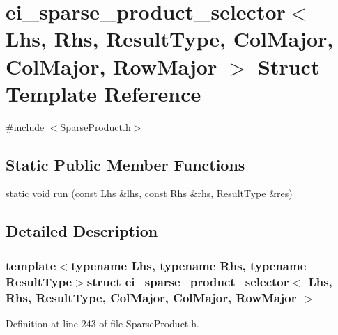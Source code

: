 \hypertarget{structei__sparse__product__selector_3_01_lhs_00_01_rhs_00_01_result_type_00_01_col_major_00_01_col_major_00_01_row_major_01_4}{\section{ei\-\_\-sparse\-\_\-product\-\_\-selector$<$ Lhs, Rhs, Result\-Type, Col\-Major, Col\-Major, Row\-Major $>$ Struct Template Reference}
\label{structei__sparse__product__selector_3_01_lhs_00_01_rhs_00_01_result_type_00_01_col_major_00_01_col_major_00_01_row_major_01_4}
}


{\ttfamily \#include $<$Sparse\-Product.\-h$>$}

\subsection*{Static Public Member Functions}
\begin{DoxyCompactItemize}
\item 
static \hyperlink{group___u_a_v_objects_plugin_ga444cf2ff3f0ecbe028adce838d373f5c}{void} \hyperlink{structei__sparse__product__selector_3_01_lhs_00_01_rhs_00_01_result_type_00_01_col_major_00_01_col_major_00_01_row_major_01_4_acaa6f0872fd44455f890d8941019727d}{run} (const Lhs \&lhs, const Rhs \&rhs, Result\-Type \&\hyperlink{glext_8h_a1dbb21208b9047cc8031ca9c840d3c2f}{res})
\end{DoxyCompactItemize}


\subsection{Detailed Description}
\subsubsection*{template$<$typename Lhs, typename Rhs, typename Result\-Type$>$struct ei\-\_\-sparse\-\_\-product\-\_\-selector$<$ Lhs, Rhs, Result\-Type, Col\-Major, Col\-Major, Row\-Major $>$}



Definition at line 243 of file Sparse\-Product.\-h.



